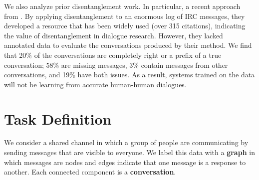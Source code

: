 \documentclass[11pt,a4paper]{article}
\makeatletter
\newcommand{\LoweCites}{315\@\xspace}
\makeatother
\begin{document}
We also analyze prior disentanglement work.
In particular, a recent approach from \citet{Lowe:2015,Lowe:2017:DD}.
By applying disentanglement to an enormous log of IRC messages, they developed a resource that has been widely used (over \LoweCites citations), indicating the value of disentanglement in dialogue research.
However, they lacked annotated data to evaluate the conversations produced by their method.
We find that 20\% of the conversations are completely right or a prefix of a true conversation; 58\% are missing messages, 3\% contain messages from other conversations, and 19\% have both issues.
As a result, systems trained on the data will not be learning from accurate human-human dialogues.

\section{Task Definition}

We consider a shared channel in which a group of people are communicating by sending messages that are visible to everyone.
We label this data with a \textbf{graph} in which messages are nodes and edges indicate that one message is a response to another.
Each connected component is a \textbf{conversation}.
\end{document}
